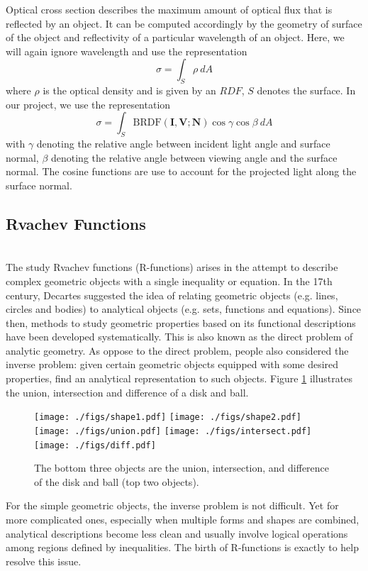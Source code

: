 \documentclass[11pt]{amsart}
\newcommand{\BRDF}{\mathrm{BRDF}}
\theoremstyle{definition}
\begin{document}
Optical cross section describes the maximum amount of optical flux that is reflected by an object. It can be computed accordingly by the geometry of surface of the object and reflectivity of a particular wavelength of an object. Here, we will again ignore wavelength and use the representation 
$$\sigma=\int_{S} \rho \: dA$$
where $\rho$ is the optical density and is given by an $RDF$, $S$ denotes the surface. In our project, we use the representation
$$\sigma= \int_S\BRDF(\mathbf{I},\mathbf{V};\mathbf{N}) \cos\gamma\cos\beta \: dA$$
with $\gamma$ denoting the relative angle between incident light angle and surface normal, $\beta$ denoting the relative angle between viewing angle and the surface normal. The cosine functions are use to account for the projected light along the surface normal. 

\subsection{Rvachev Functions}~\\
The study Rvachev functions (R-functions) arises in the attempt
to describe complex geometric objects with a single inequality or equation. In the
17th century, Decartes suggested the idea of relating geometric objects (e.g.
lines, circles and bodies) to analytical objects (e.g. sets, functions and
equations). Since then, methods to study geometric properties based on its
functional descriptions have been developed systematically. This is also known
as the direct problem of analytic geometry. As oppose to the direct problem,
people also considered the inverse problem: given certain geometric objects
equipped with some desired properties, find an analytical representation to
such objects. Figure \ref{DiskAndBall} illustrates the union, intersection and difference of a disk and ball. 

\begin{figure}[H]
\texttt{[image: ./figs/shape1.pdf]}
\texttt{[image: ./figs/shape2.pdf]}
\\
\texttt{[image: ./figs/union.pdf]}
\texttt{[image: ./figs/intersect.pdf]}
\texttt{[image: ./figs/diff.pdf]}
\caption{The bottom three objects are the union, intersection, and difference of the disk and ball (top two objects).}
\label{DiskAndBall}
\end{figure}

For the simple geometric objects, the inverse problem is not
difficult. Yet for more complicated ones, especially when multiple forms
and shapes are combined, analytical descriptions become less clean and usually involve logical operations among regions defined by inequalities. The birth of R-functions is exactly to help resolve this issue.    
\end{document}
